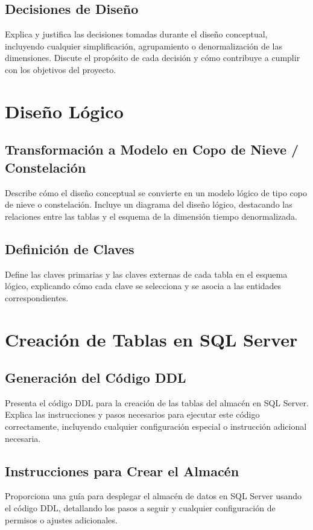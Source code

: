 \documentclass{article}
\begin{document}
\subsection{Decisiones de Diseño}
Explica y justifica las decisiones tomadas durante el diseño conceptual, incluyendo cualquier simplificación, agrupamiento o denormalización de las dimensiones. Discute el propósito de cada decisión y cómo contribuye a cumplir con los objetivos del proyecto.

\section{Diseño Lógico}
\label{sec:diseno_logico}
\subsection{Transformación a Modelo en Copo de Nieve / Constelación}
Describe cómo el diseño conceptual se convierte en un modelo lógico de tipo copo de nieve o constelación. Incluye un diagrama del diseño lógico, destacando las relaciones entre las tablas y el esquema de la dimensión tiempo denormalizada.

\subsection{Definición de Claves}
Define las claves primarias y las claves externas de cada tabla en el esquema lógico, explicando cómo cada clave se selecciona y se asocia a las entidades correspondientes.

\section{Creación de Tablas en SQL Server}
\label{sec:creacion_tablas}
\subsection{Generación del Código DDL}
Presenta el código DDL para la creación de las tablas del almacén en SQL Server. Explica las instrucciones y pasos necesarios para ejecutar este código correctamente, incluyendo cualquier configuración especial o instrucción adicional necesaria.

\subsection{Instrucciones para Crear el Almacén}
Proporciona una guía para desplegar el almacén de datos en SQL Server usando el código DDL, detallando los pasos a seguir y cualquier configuración de permisos o ajustes adicionales.
\end{document}
